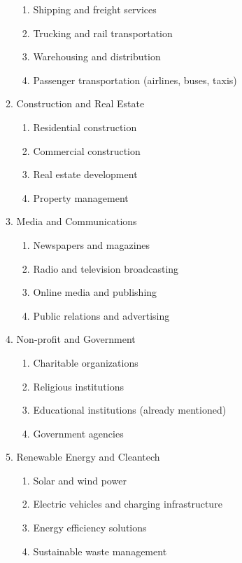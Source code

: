 \begin{enumerate}
\begin{enumerate}
\begin{enumerate}
            \item Shipping and freight services
            \item Trucking and rail transportation
            \item Warehousing and distribution
            \item Passenger transportation (airlines, buses, taxis)
        \end{enumerate}
        \item Construction and Real Estate
        \begin{enumerate}
            \item Residential construction
            \item Commercial construction
            \item Real estate development
            \item Property management
        \end{enumerate}
        \item Media and Communications
        \begin{enumerate}
            \item Newspapers and magazines
            \item Radio and television broadcasting
            \item Online media and publishing
            \item Public relations and advertising
        \end{enumerate}
        \item Non-profit and Government
        \begin{enumerate}
            \item Charitable organizations
            \item Religious institutions
            \item Educational institutions (already mentioned)
            \item Government agencies
        \end{enumerate}
        \item Renewable Energy and Cleantech
        \begin{enumerate}
            \item Solar and wind power
            \item Electric vehicles and charging infrastructure
            \item Energy efficiency solutions
            \item Sustainable waste management
        \end{enumerate}

\end{enumerate}
\end{enumerate}
